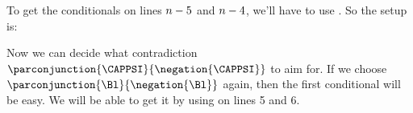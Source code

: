 To get the conditionals on lines $n-5$ and $n-4$, we'll have to use . So the setup is:
\begin{gproof}
\end{gproof}
Now we can decide what contradiction $\parconjunction{\CAPPSI}{\negation{\CAPPSI}}$ to aim for. If we choose $\parconjunction{\Bl}{\negation{\Bl}}$ again, then the first conditional will be easy. We will be able to get it by using  on lines 5 and 6.
